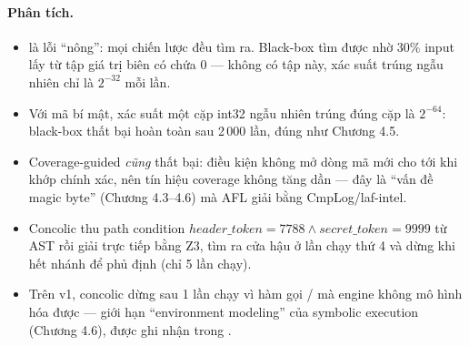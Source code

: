\paragraph{Phân tích.}
\begin{itemize}
  \item {} là lỗi ``nông'': mọi chiến lược đều tìm ra. Black-box tìm được nhờ
        30\% input lấy từ tập giá trị biên có chứa 0 — không có tập này, xác suất trúng
         ngẫu nhiên chỉ là $2^{-32}$ mỗi lần.
  \item Với mã bí mật, xác suất một cặp int32 ngẫu nhiên trúng đúng cặp là $2^{-64}$: black-box
        thất bại hoàn toàn sau 2\,000 lần, đúng như Chương 4.5.
  \item Coverage-guided \emph{cũng} thất bại: điều kiện  không mở
        dòng mã mới cho tới khi khớp chính xác, nên tín hiệu coverage không tăng dần — đây là
        ``vấn đề magic byte'' (Chương 4.3--4.6) mà AFL giải bằng CmpLog/laf-intel.
  \item Concolic thu path condition $\mathit{header\_token} = 7788 \wedge \mathit{secret\_token}
        = 9999$ từ AST rồi giải trực tiếp bằng Z3, tìm ra cửa hậu ở lần chạy thứ 4 và dừng khi
        hết nhánh để phủ định (chỉ 5 lần chạy).
  \item Trên v1, concolic dừng sau 1 lần chạy vì hàm gọi / mà engine
        không mô hình hóa được — giới hạn ``environment modeling'' của symbolic execution
        (Chương 4.6), được ghi nhận trong .
\end{itemize}

